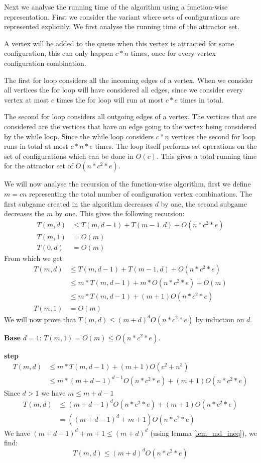 Next we analyse the running time of the algorithm using a function-wise representation. First we consider the variant where sets of configurations are represented explicitly. We first analyse the running time of the attractor set. 

A vertex will be added to the queue when this vertex is attracted for some configuration, this can only happen $c*n$ times, once for every vertex configuration combination. 

The first for loop considers all the incoming edges of a vertex. When we consider all vertices the for loop will have considered all edges, since we consider every vertex at most $c$ times the for loop will run at most $c*e$ times in total.

The second for loop considers all outgoing edges of a vertex. The vertices that are considered are the vertices that have an edge going to the vertex being considered by the while loop. Since the while loop considers $c*n$ vertices the second for loop runs in total at most $c * n * e$ times. The loop itself performs set operations on the set of configurations which can be done in $O(c)$. This gives a total running time for the attractor set of $O(n*c^2*e)$.

We will now analyse the recursion of the function-wise algorithm, first we define $m = cn$ representing the total number of configuration vertex combinations. The first subgame created in the algorithm decreases $d$ by one, the second subgame decreases the $m$ by one. This gives the following recursion:
\begin{align*}
T(m,d) &\leq T(m, d-1) + T(m-1, d) + O(n*c^2*e)\\
T(m,1) &= O(m)\\
T(0,d) &= O(m)
\end{align*}
From which we get 
\begin{align*}
T(m,d) &\leq T(m, d-1) + T(m-1, d) + O(n*c^2*e)\\
&\leq m*T(m, d-1) + m*O(n*c^2*e) + O(m)\\
&\leq m*T(m, d-1) + (m+1)O(n*c^2*e)\\
T(m,1) &= O(m)
\end{align*}
We will now prove that $T(m,d) \leq (m+d)^dO(n*c^2*e)$ by induction on $d$.

\textbf{Base} $d = 1$: $T(m,1) = O(m) \leq O(n*c^2*e)$.

\textbf{step} 
\begin{align*}
T(m,d) &\leq m*T(m,d-1) + (m+1)O(c^2 + n^3)\\
&\leq m*(m+d-1)^{d-1}O(n*c^2*e) + (m+1)O(n*c^2*e)
\end{align*}
Since $d > 1$ we have $m \leq m+d-1$
\begin{align*}
T(m,d) &\leq (m+d-1)^{d}O(n*c^2*e) + (m+1)O(n*c^2*e)\\
& = ((m+d-1)^d + m + 1)O(n*c^2*e)
\end{align*}
We have $(m+d-1)^d + m + 1 \leq (m+d)^d$ (using lemma \ref{lem_md_ineq}), we find:\\
\[ T(m,d) \leq (m+d)^dO(n*c^2*e) \]

